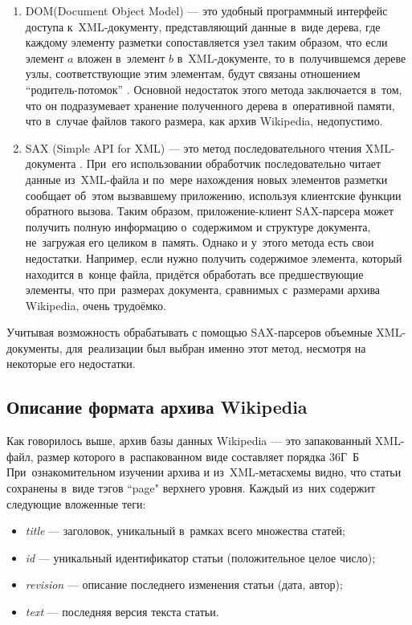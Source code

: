 \begin{enumerate}

\item{
DOM(Document Object Model) --- 
это удобный программный интерфейс доступа к~XML-документу, 
представляющий данные в~виде дерева, где каждому элементу разметки сопоставляется узел таким образом, 
что если элемент $a$ вложен в~элемент $b$ в~XML-документе, то в~получившемся дереве узлы, соответствующие этим элементам, 
будут связаны отношением ``родитель-потомок'' \cite{dom} .
Основной недостаток этого метода заключается в~том, что он подразумевает хранение полученного дерева в~оперативной памяти, 
что в~случае файлов такого размера, как архив Wikipedia, недопустимо.
}

\item {
SAX (Simple API for XML) --- 
это метод последовательного чтения XML-документа \cite{sax}. 
При~его использовании обработчик последовательно читает данные из~XML-файла и по~мере нахождения новых элементов разметки сообщает об~этом вызвавшему приложению, 
используя клиентские функции обратного вызова\cite{callback}. 
Таким образом, приложение-клиент SAX-парсера может получить полную информацию о~содержимом и структуре документа,
не~загружая его целиком в~память. 
Однако и у~этого метода есть свои недостатки. 
Например, если нужно получить содержимое элемента, который находится в~конце файла, придётся обработать все предшествующие элементы, 
что при~размерах документа, сравнимых с~размерами архива  Wikipedia, 
очень трудоёмко.

}

\end{enumerate}

Учитывая возможность обрабатывать с помощью SAX-парсеров объемные XML-документы, 
для~реализации был выбран именно этот метод, несмотря на некоторые его недостатки.

\subsection{Описание формата архива Wikipedia}

Как говорилось выше, архив  базы данных Wikipedia --- это запакованный XML-файл, 
размер которого в~распакованном виде составляет порядка 36Г~Б
При~ознакомительном изучении архива и из~XML-метасхемы \cite{schema} видно, 
что статьи сохранены в~виде тэгов ``page" верхнего уровня. 
Каждый из~них содержит следующие вложенные теги:

\begin{itemize}
\item{{\it title} --- заголовок, уникальный в~рамках всего множества статей;}
\item{{\it id} --- уникальный идентификатор статьи (положительное целое число);}
\item{{\it revision} --- описание последнего изменения статьи (дата, автор);}
\item{{\it text} --- последняя версия текста статьи.}
\end{itemize}

